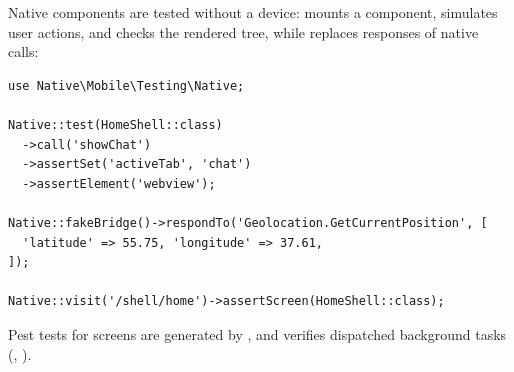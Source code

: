 Native components are tested without a device:  mounts a component, simulates
user actions, and checks the rendered tree, while  replaces responses of
native calls:

\begin{lstlisting}
use Native\Mobile\Testing\Native;

Native::test(HomeShell::class)
  ->call('showChat')
  ->assertSet('activeTab', 'chat')
  ->assertElement('webview');

Native::fakeBridge()->respondTo('Geolocation.GetCurrentPosition', [
  'latitude' => 55.75, 'longitude' => 37.61,
]);

Native::visit('/shell/home')->assertScreen(HomeShell::class);
\end{lstlisting}

\noindent Pest tests for screens are generated by , and
 verifies dispatched background tasks (,
).
